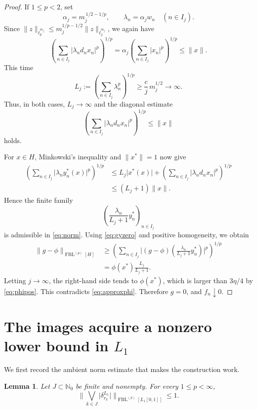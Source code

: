 \documentclass[11pt]{article}
\newtheorem{lemma}[theorem]{Lemma}
\theoremstyle{remark}
\newcommand{\FBL}[2]{\operatorname{FBL}^{(#1)}[#2]}
\newcommand{\N}{\mathbb{N}}
\newcommand{\abs}[1]{\lvert #1\rvert}
\newcommand{\norm}[1]{\lVert #1\rVert}
\begin{document}
\begin{proof}
If \(1\le p<2\), set
\[
  \alpha_j=m_j^{\,1/2-1/p},
  \qquad
  \lambda_n=\alpha_jw_n\quad(n\in I_j).
\]
Since
\(\norm{z}_{\ell_p^{m_j}}\le m_j^{1/p-1/2}\norm{z}_{\ell_2^{m_j}}\),
we again have
\begin{equation}\label{eq:diagsmallp}
  \left(\sum_{n\in I_j}\abs{\lambda_nd_nx_n}^p\right)^{1/p}
  =\alpha_j\left(\sum_{n\in I_j}\abs{x_n}^p\right)^{1/p}
  \le\norm{x}.
\end{equation}
This time
\[
  L_j:=\left(\sum_{n\in I_j}\lambda_n^p\right)^{1/p}
  \ge \frac{c}{j}\,m_j^{1/2}\longrightarrow\infty.
\]
Thus, in both cases, \(L_j\to\infty\) and the diagonal estimate
\begin{equation}\label{eq:diagall}
  \left(\sum_{n\in I_j}\abs{\lambda_nd_nx_n}^p\right)^{1/p}
  \le\norm{x}
\end{equation}
holds.

For \(x\in H\), Minkowski's inequality and \(\norm{x^*}=1\) now give
\[
 \begin{aligned}
  \left(\sum_{n\in I_j}\abs{\lambda_ny_n^*(x)}^p\right)^{1/p}
  &\le
  L_j\abs{x^*(x)}
   +\left(\sum_{n\in I_j}\abs{\lambda_nd_nx_n}^p\right)^{1/p}\\
  &\le (L_j+1)\norm{x}.
 \end{aligned}
\]
Hence the finite family
\[
  \left(\frac{\lambda_n}{L_j+1}y_n^*\right)_{n\in I_j}
\]
is admissible in \eqref{eq:norm}.  Using \eqref{eq:gyzero} and positive
homogeneity, we obtain
\[
 \begin{aligned}
  \norm{g-\phi}_{\FBL{p}{H}}
  &\ge
  \left(
    \sum_{n\in I_j}
    \abs{(g-\phi)\left(\frac{\lambda_n}{L_j+1}y_n^*\right)}^p
  \right)^{1/p}\\
  &=\phi(x^*)\frac{L_j}{L_j+1}.
 \end{aligned}
\]
Letting \(j\to\infty\), the right-hand side tends to \(\phi(x^*)\),
which is larger than \(3\eta/4\) by \eqref{eq:phipos}.  This contradicts
\eqref{eq:approxphi}.  Therefore \(g=0\), and \(f_n\downarrow0\).
\end{proof}

\section{The images acquire a nonzero lower bound in \texorpdfstring{\(L_1\)}{L1}}

We first record the ambient norm estimate that makes the construction work.

\begin{lemma}\label{lem:rademacher-join}
Let \(J\subset\N_0\) be finite and nonempty.  For every
\(1\le p<\infty\),
\[
  \norm{\bigvee_{k\in J}\abs{\delta_{r_k}^{L_1}}}_{\FBL{p}{L_1[0,1]}}
  \le1.
\]
\end{lemma}
\end{document}
